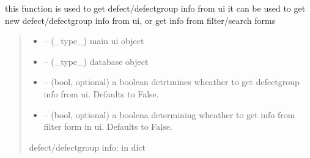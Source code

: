 \documentclass[letterpaper,10pt,english]{sphinxmanual}
\begin{document}
\begin{savenotes}\begin{fulllineitems}
\label{\detokenize{setting/backend/defect_management_funcs:oxin.backend.defect_management_funcs.get_defect_info_from_ui}}
\pysigstartsignatures
{}
\pysigstopsignatures
\sphinxAtStartPar
this function is used to get defect/defect\sphinxhyphen{}group info from ui
it can be used to get new defect/defect\sphinxhyphen{}group info from ui, or get info from filter/search forms
\begin{quote}\begin{description}
\begin{itemize}
\item {} 
\sphinxAtStartPar
{} – (\_type\_) main ui object

\item {} 
\sphinxAtStartPar
{} – (\_type\_) database object

\item {} 
\sphinxAtStartPar
{} – (bool, optional) a boolean detrtmines wheather to get defect\sphinxhyphen{}group info from ui. Defaults to False.

\item {} 
\sphinxAtStartPar
{} – (bool, optional) a boolena determining wheather to get info from filter form in ui. Defaults to False.

\end{itemize}

\sphinxAtStartPar
defect/defect\sphinxhyphen{}group info: in dict

\end{description}\end{quote}

\end{fulllineitems}\end{savenotes}

\end{document}
